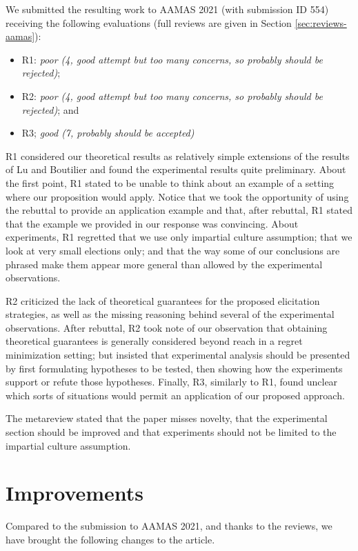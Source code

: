 \documentclass[version=3.21, pagesize, twoside=off, bibliography=totoc, DIV=calc, fontsize=12pt, a4paper]{scrartcl}
\begin{document}
We submitted the resulting work to AAMAS 2021 (with submission ID 554) receiving the following evaluations (full reviews are given in Section \ref{sec:reviews-aamas}):
\begin{itemize}
\item R1: {\em poor (4, good attempt but too many concerns, so probably should be rejected)};
\item R2: {\em poor (4, good attempt but too many concerns, so probably should be rejected)}; and
\item R3; {\em good (7, probably should be accepted)}
\end{itemize}
R1 considered our theoretical results as relatively simple extensions of the results of Lu and Boutilier and found the experimental results quite preliminary. About the first point, R1 stated to be unable to think about an example of a setting where our proposition would apply. 
Notice that we took the opportunity of using the rebuttal to provide an application example and that, after rebuttal, R1 stated that the example we provided in our response was convincing.
About experiments, R1 regretted that we use only impartial culture assumption; that we look at very small elections only; and that the way some of our conclusions are phrased make them appear more general than allowed by the experimental observations. 

R2 criticized the lack of theoretical guarantees for the proposed elicitation strategies, as well as the missing reasoning behind several of the experimental observations. After rebuttal, R2 took note of our observation that obtaining theoretical guarantees is generally considered beyond reach in a regret minimization setting; but insisted that experimental analysis should be presented by first formulating hypotheses to be tested, then showing how the experiments support or refute those hypotheses. Finally, R3, similarly to R1, found unclear which sorts of situations would permit an application of our proposed approach.

The metareview stated that the paper misses novelty, that the experimental section should be improved and that experiments should not be limited to the impartial culture assumption.

\section{Improvements}
Compared to the submission to AAMAS 2021, and thanks to the reviews, we have brought the following changes to the article.
\end{document}
